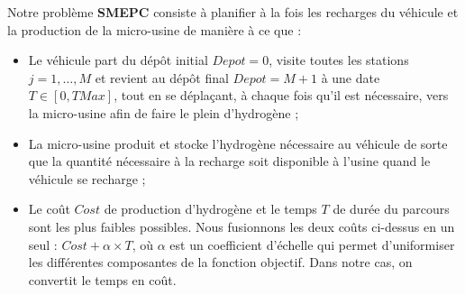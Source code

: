 Notre problème \textbf{SMEPC} consiste à planifier à la fois les recharges du véhicule et la production de la micro-usine de manière à ce que :
\begin{itemize}[label=$\square$]
	\item Le véhicule part du dépôt initial $Depot = 0$, visite toutes les stations $j = 1, \dots, M$ et revient au dépôt final $Depot = M+1$ à une date $T \in [0, TMax]$, tout en se déplaçant, à chaque fois qu'il est nécessaire, vers la micro-usine afin de faire le plein d'hydrogène ;
	\item La micro-usine produit et stocke l'hydrogène nécessaire au véhicule de sorte que la quantité nécessaire à la recharge soit disponible à l'usine quand le véhicule se recharge ;
	\item Le coût $Cost$ de production d'hydrogène et le temps $T $ de durée du parcours sont les plus faibles possibles. Nous fusionnons les deux coûts ci-dessus en un seul : $Cost + \alpha \times T$, où $\alpha$ est un coefficient d'échelle qui permet d'uniformiser les différentes composantes de la fonction objectif. Dans notre cas, on convertit le temps en coût.
\end{itemize}
